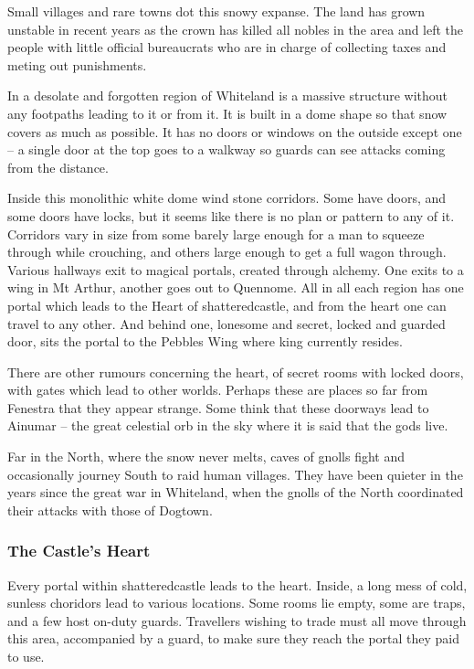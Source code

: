 \begin{multicols}{2}
Small villages and rare towns dot this snowy expanse.  The land has grown unstable in recent years as the crown has killed all nobles in the area and left the people with little official bureaucrats who are in charge of collecting taxes and meting out punishments.

In a desolate and forgotten region of Whiteland is a massive structure without any footpaths leading to it or from it.
It is built in a dome shape so that snow covers as much as possible.
It has no doors or windows on the outside except one -- a single door at the top goes to a walkway so guards can see attacks coming from the distance.

Inside this monolithic white dome wind stone corridors.
Some have doors, and some doors have locks, but it seems like there is no plan or pattern to any of it.
Corridors vary in size from some barely large enough for a man to squeeze through while crouching, and others large enough to get a full wagon through.
Various hallways exit to magical portals, created through alchemy.
One exits to a wing in Mt Arthur, another goes out to Quennome.
All in all each region has one portal which leads to the Heart of \gls{shatteredcastle}, and from the heart one can travel to any other.
And behind one, lonesome and secret, locked and guarded door, sits the portal to the Pebbles Wing where \gls{king} currently resides.

There are other rumours concerning the heart, of secret rooms with locked doors, with gates which lead to other worlds.  Perhaps these are places so far from Fenestra that they appear strange.  Some think that these doorways lead to Ainumar -- the great celestial orb in the sky where it is said that the gods live.

Far in the North, where the snow never melts, caves of gnolls fight and occasionally journey South to raid human villages.  They have been quieter in the years since the great war in Whiteland, when the gnolls of the North coordinated their attacks with those of Dogtown.

\subsubsection{The Castle's Heart}\label{whiteland_heart}

Every portal within \gls{shatteredcastle} leads to the heart.
Inside, a long mess of cold, sunless choridors lead to various locations.
Some rooms lie empty, some are traps, and a few host on-duty guards.
Travellers wishing to trade must all move through this area, accompanied by a guard, to make sure they reach the portal they paid to use.


\end{multicols}
